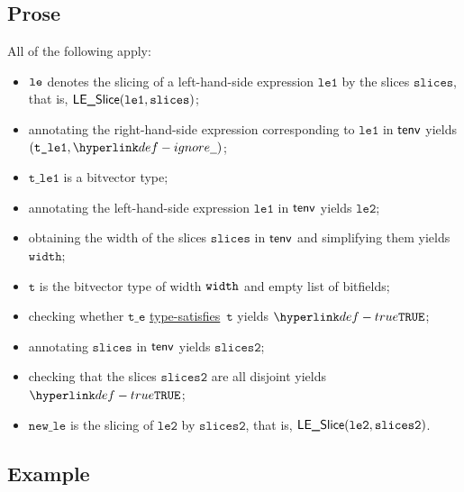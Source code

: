 \documentclass{book}
\newcommand\ProseOrTypeError[0]{\ProseTerminateAs{\TypeErrorConfig}}
\newcommand\typesatisfies[0]{\hyperlink{def-typesatisfies}{type-satisfies}}
\newcommand\vt[0]{\texttt{t}}
\newcommand\vte[0]{\texttt{t\_e}}
\newcommand\vleone[0]{\texttt{le1}}
\newcommand\vletwo[0]{\texttt{le2}}
\newcommand\vtleone[0]{\texttt{t\_le1}}
\newcommand\vwidth[0]{\texttt{width}}
\newcommand\newle[0]{\texttt{new\_le}}
\newcommand\slices[0]{\texttt{slices}}
\newcommand\slicestwo[0]{\texttt{slices2}}
\begin{document}
\subsection{Prose}
All of the following apply:
\begin{itemize}
  \item $\texttt{le}$ denotes the slicing of a left-hand-side expression $\vleone$ by the slices $\slices$, that is, $\LESlice(\vleone, \slices)$;
  \item annotating the right-hand-side expression corresponding to $\vleone$ in $\textsf{tenv}$ yields \\
        $(\vtleone, \Ignore)$\ProseOrTypeError;
  \item $\vtleone$ is a bitvector type;
  \item annotating the left-hand-side expression $\vleone$ in $\textsf{tenv}$ yields $\vletwo$\ProseOrTypeError;
  \item obtaining the width of the slices $\slices$ in $\textsf{tenv}$ and simplifying them yields $\vwidth$;
  \item $\vt$ is the bitvector type of width $\texttt{width}$ and empty list of bitfields;
  \item checking whether $\vte$ \typesatisfies\ $\vt$ yields $\True$\ProseOrTypeError;
  \item annotating $\slices$ in $\textsf{tenv}$ yields $\slicestwo$\ProseOrTypeError;
  \item checking that the slices $\slicestwo$ are all disjoint yields $\True$\ProseOrTypeError;
  \item $\newle$ is the slicing of $\vletwo$ by $\slicestwo$, that is, $\LESlice(\vletwo, \slicestwo)$.
\end{itemize}

\subsection{Example}

\end{document}
